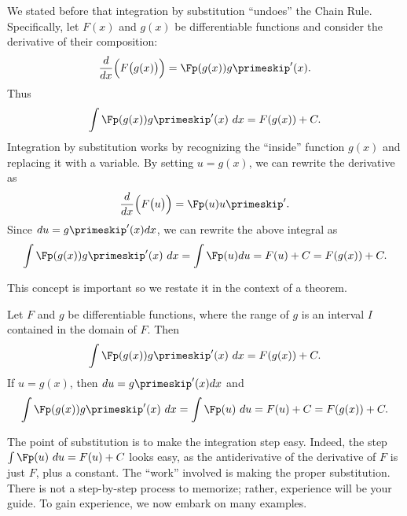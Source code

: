 We stated before that integration by substitution ``undoes'' the Chain Rule. Specifically, let $F(x)$ and $g(x)$ be differentiable functions and consider the derivative of their composition:
\[\frac{d}{dx}\Bigl(F\bigl(g(x)\bigr)\Bigr) = \Fp(g(x))g\primeskip'(x).\]
Thus\vspace{-.3\baselineskip}
\[\int \Fp(g(x))g\primeskip'(x)\ dx = F(g(x)) + C.\]
Integration by substitution works by recognizing the ``inside'' function $g(x)$ and replacing it with a variable. By setting $u=g(x)$, we can rewrite the derivative as\vspace{-.3\baselineskip}
\[\frac{d}{dx}\Bigl(F\bigl(u\bigr)\Bigr) = \Fp(u)u\primeskip'.\]
Since $du = g\primeskip'(x)dx$, we can rewrite the above integral as
\[\int \Fp(g(x))g\primeskip'(x)\ dx = \int \Fp(u) du = F(u)+C = F(g(x))+ C.\]
	
This concept is important so we restate it in the context of a theorem.

\begin{theorem}\label{thm:subst}
Let $F$ and $g$ be differentiable functions, where the range of $g$ is an interval $I$ contained in the domain of $F$. Then 
\[\int \Fp(g(x))g\primeskip'(x)\ dx = F(g(x)) + C.\]
If $u = g(x)$, then $du = g\primeskip'(x)dx$ and 
\[\int \Fp(g(x))g\primeskip'(x)\ dx = \int \Fp(u)\ du = F(u)+C = F(g(x))+C.\]
\end{theorem}

The point of substitution is to make the integration step easy. Indeed, the step $\int \Fp(u)\ du = F(u) + C$ looks easy, as the antiderivative of the derivative of $F$ is just $F$, plus a constant. The ``work'' involved is making the proper substitution. There is not a step-by-step process to memorize; rather, experience will be your guide. To gain experience, we now embark on many examples.


